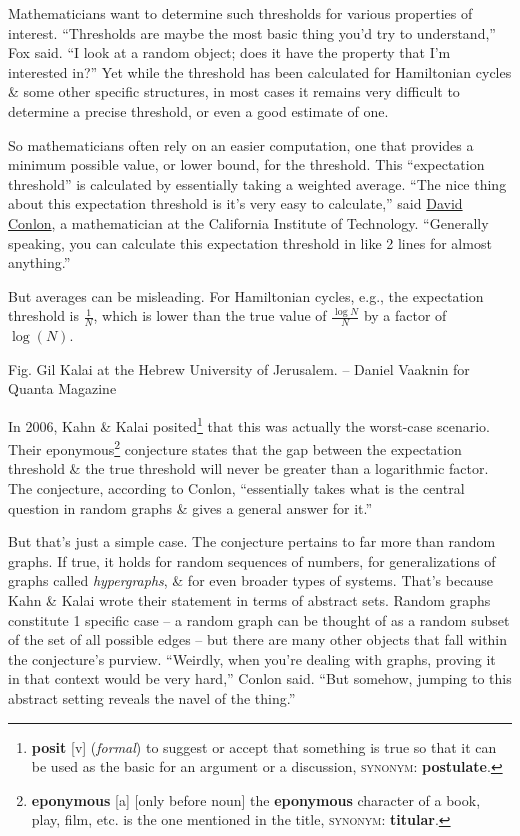 \documentclass[oneside]{book}
\numberwithin{equation}{section}
\begin{document}
Mathematicians want to determine such thresholds for various properties of interest. ``Thresholds are maybe the most basic thing you'd try to understand,'' Fox said. ``I look at a random object; does it have the property that I'm interested in?'' Yet while the threshold has been calculated for Hamiltonian cycles \& some other specific structures, in most cases it remains very difficult to determine a precise threshold, or even a good estimate of one.

So mathematicians often rely on an easier computation, one that provides a minimum possible value, or lower bound, for the threshold. This ``expectation threshold'' is calculated by essentially taking a weighted average. ``The nice thing about this expectation threshold is it's very easy to calculate,'' said \href{http://www.its.caltech.edu/~dconlon/}{David Conlon}, a mathematician at the California Institute of Technology. ``Generally speaking, you can calculate this expectation threshold in like 2 lines for almost anything.''

But averages can be misleading. For Hamiltonian cycles, e.g., the expectation threshold is $\frac{1}{N}$, which is lower than the true value of $\frac{\log N}{N}$ by a factor of $\log(N)$.

\textsf{Fig. Gil Kalai at the Hebrew University of Jerusalem.} -- Daniel Vaaknin for Quanta Magazine

In 2006, Kahn \& Kalai posited\footnote{\textbf{posit} [v] (\textit{formal}) to suggest or accept that something is true so that it can be used as the basic for an argument or a discussion, \textsc{synonym}: \textbf{postulate}.} that this was actually the worst-case scenario. Their eponymous\footnote{\textbf{eponymous} [a] [only before noun] the \textbf{eponymous} character of a book, play, film, etc. is the one mentioned in the title, \textsc{synonym}: \textbf{titular}.} conjecture states that the gap between the expectation threshold \& the true threshold will never be greater than a logarithmic factor. The conjecture, according to Conlon, ``essentially takes what is the central question in random graphs \& gives a general answer for it.''

But that's just a simple case. The conjecture pertains to far more than random graphs. If true, it holds for random sequences of numbers, for generalizations of graphs called \textit{hypergraphs}, \& for even broader types of systems. That's because Kahn \& Kalai wrote their statement in terms of abstract sets. Random graphs constitute 1 specific case -- a random graph can be thought of as a random subset of the set of all possible edges -- but there are many other objects that fall within the conjecture's purview. ``Weirdly, when you're dealing with graphs, proving it in that context would be very hard,'' Conlon said. ``But somehow, jumping to this abstract setting reveals the navel of the thing.''
\end{document}

